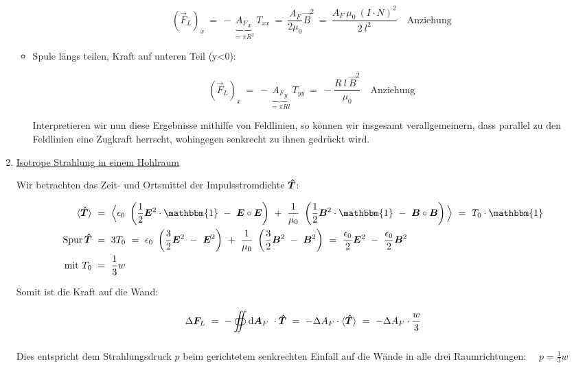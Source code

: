 \begin{enumerate}[label=\roman*)]
\begin{itemize}
		\begin{equation*}
		(\vec{F}_L)_x \ = \ - \underbrace{{A_F}_x}_{= \pi R^2} \ T_{xx} \ = \ \frac{A_F}{2\mu_0}\vec{B}^2 \ = \ \frac{A_F \ \mu_0 \ (I \cdot N)^2}{2\ l^2} \quad \text{Anziehung}
		\end{equation*}
		
		\item Spule längs teilen, Kraft auf unteren Teil (y<0):
		
		\begin{equation*}
		(\vec{F}_L)_x \ = \ -\underbrace{{A_F}_y}_{=\pi R l} \ T_{yy} \ = \ -\frac{R \ l \ \vec{B}^2}{\mu_0} \quad \text{Anziehung}
		\end{equation*}
		
		Interpretieren wir nun diese Ergebnisse mithilfe von Feldlinien, so können wir insgesamt verallgemeinern, dass parallel zu den Feldlinien eine Zugkraft herrscht, wohingegen senkrecht zu ihnen gedrückt wird. 
	\end{itemize}
	
	\item \underline{Isotrope Strahlung in einem Hohlraum}
	
	Wir betrachten das Zeit- und Ortsmittel der Impulsstromdichte $\bm{\hat{T}}$:
	
	\begin{align*}
	\langle\tens{T}\rangle \ &= \ \Big\langle \epsilon_0 \ \left(\frac{1}{2}\vec{E}^2\cdot\mathbbm{1} \ - \ \vec{E}\circ\vec{E}\right) \ + \ \frac{1}{\mu_0} \ \left(\frac{1}{2}\vec{B}^2\cdot\mathbbm{1} \ - \ \vec{B}\circ\vec{B}\right) \Big\rangle \ = \ T_0 \cdot \mathbbm{1}\\
	\operatorname{Spur} \tens{T} \ &= \ 3 T_0 \ = \ \epsilon_0 \ \left(\frac{3}{2}\vec{E}^2 \ - \ \vec{E}^2\right) \ + \ \frac{1}{\mu_0} \ \left(\frac{3}{2}\vec{B}^2 \ - \ \vec{B}^2\right) \ = \ \frac{\epsilon_0}{2}\vec{E}^2 \ - \ \frac{\epsilon_0}{2}\vec{B}^2 \\
	\text{mit } T_0 \ &= \ \frac{1}{3} w 
	\end{align*}
	
	Somit ist die Kraft auf die Wand:
	
	\begin{equation*}
	\Delta\vec{F}_L \ = \ -\Oiint{}{}{\vec{A}_F} \cdot\tens{T} \ = \ - \Delta A_F \cdot \langle\tens{T} \rangle \ = \ - \Delta A_F \cdot \frac{w}{3}
	\end{equation*}
	
	Dies entspricht dem Strahlungsdruck $p$ beim gerichtetem senkrechten Einfall auf die Wände in alle drei Raumrichtungen: $\quad p = \frac{1}{3}w$
\end{enumerate}
